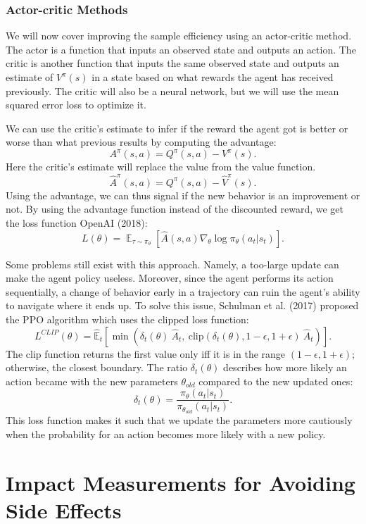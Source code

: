 \documentclass[12pt,A4]{report}
\theoremstyle{definition}
\begin{document}
\subsubsection{Actor-critic Methods}

We will now cover improving the sample efficiency using an actor-critic method. The actor is a function that inputs an observed state and outputs an action. The critic is another function that inputs the same observed state and outputs an estimate of $V^\pi(s)$ in a state based on what rewards the agent has received previously. The critic will also be a neural network, but we will use the mean squared error loss to optimize it.

We can use the critic's estimate to infer if the reward the agent got is better or worse than what previous results by computing the advantage:
\[A^\pi(s,a) = Q^\pi(s, a) - V^\pi(s).\]
Here the critic's estimate will replace the value from the value function.
\[\hat{A}^\pi(s,a) = Q^\pi(s, a) - \hat{V}^\pi(s).\]
Using the advantage, we can thus signal if the new behavior is an improvement or not. By using the advantage function instead of the discounted reward, we get the loss function OpenAI (2018):
\[ L(\theta) = \mathop{\mathbb{E}}_{\tau \sim \pi_\theta} [\hat{A}(s,a) \nabla_\theta \log \pi_\theta (a_t|s_t) ]. \]

Some problems still exist with this approach. Namely, a too-large update can make the agent policy useless. Moreover, since the agent performs its action sequentially, a change of behavior early in a trajectory can ruin the agent's ability to navigate where it ends up. To solve this issue, Schulman et al. (2017) proposed the PPO algorithm which uses the clipped loss function:
\[L^{CLIP}(\theta) = \hat{\mathbb{E}}_t \left [ \min(\delta_t(\theta) \ \hat{A}_t,\ 
\text{clip}(\delta_t(\theta), 1 - \epsilon, 1 + \epsilon) \ \hat{A}_t) \right ]. \]
The clip function returns the first value only iff it is in the range $(1-\epsilon, 1+\epsilon)$; otherwise, the closest boundary. The ratio $\delta_t(\theta)$ describes how more likely an action became with the new parameters $\theta_{old}$ compared to the new updated ones:
\[ \delta_t(\theta) = \frac{\pi_\theta(a_t| s_t)}{\pi_{\theta_{old}}(a_t|s_t)}. \]
This loss function makes it such that we update the parameters more cautiously when the probability for an action becomes more likely with a new policy. 


\section{Impact Measurements for Avoiding Side Effects}
\end{document}
